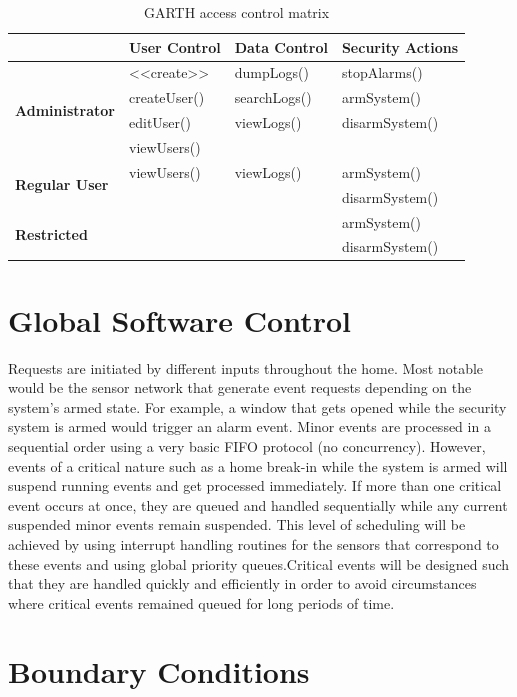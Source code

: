 \documentclass{report}
\begin{document}
\begin{table}[h]
    \caption{GARTH access control matrix}
    \label{access_control}
    \centering
    \begin{tabular}{| l | l | l | l |}
    \hline
    &\textbf{User Control}&\textbf{Data Control}&\textbf{Security Actions} \\ \hline
    \multirow{4}{*}{\textbf{Administrator}}&
    \textless\textless create\textgreater\textgreater&dumpLogs()&stopAlarms() \\
    &createUser()&searchLogs()&armSystem() \\ 
    &editUser()&viewLogs()&disarmSystem() \\
    &viewUsers()&& \\ \hline
    \multirow{2}{*}{\textbf{Regular User}}&viewUsers()&viewLogs()&armSystem() \\
    &&&disarmSystem() \\ \hline
    \multirow{2}{*}{\textbf{Restricted}}&&&armSystem() \\
    &&&disarmSystem() \\
    \hline
    \end{tabular}
\end{table}

\section{Global Software Control}

Requests are initiated by different inputs throughout the home. Most notable
would be the sensor network that generate event requests depending on the
system's armed state. For example, a window that gets opened while the security
system is armed would trigger an alarm event. Minor events are processed in a
sequential order using a very basic FIFO protocol (no concurrency). However,
events of a critical nature such as a home break-in while the system is armed
will suspend running events and get processed immediately. If more than one
critical event occurs at once, they are queued and handled sequentially while
any current suspended minor events remain suspended. This level of scheduling
will be achieved by using interrupt handling routines for the sensors that 
correspond to these events and using global priority queues.Critical events will
be designed such that they are handled quickly and efficiently in order to avoid
circumstances where critical events remained queued for long periods of time.

\section{Boundary Conditions}
\end{document}

